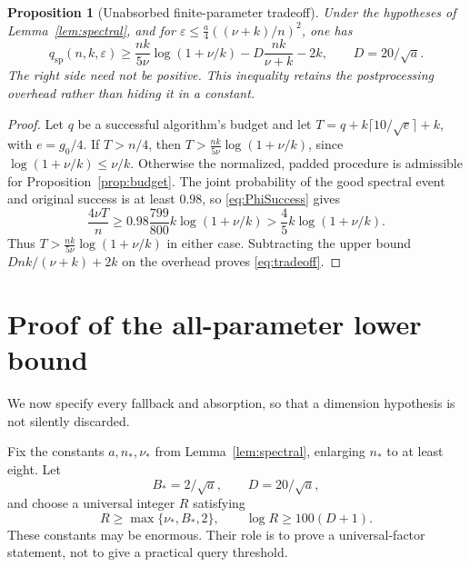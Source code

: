 \documentclass[11pt]{article}
\numberwithin{equation}{section}
\newtheorem{proposition}[theorem]{Proposition}
\theoremstyle{remark}\newtheorem{remark}[theorem]{Remark}
\newcommand{\eps}{\varepsilon}
\newcommand{\qsp}{q_{\mathrm{sp}}}
\begin{document}
\begin{proposition}[Unabsorbed finite-parameter tradeoff]\label{prop:tradeoff}
Under the hypotheses of Lemma~\ref{lem:spectral}, and for
$\eps\le \frac a4((\nu+k)/n)^2$, one has
\begin{equation}\label{eq:tradeoff}
\qsp(n,k,\eps)\ge
\frac{nk}{5\nu}\log(1+\nu/k)-D\frac{nk}{\nu+k}-2k,
\qquad D=20/\sqrt a.
\end{equation}
The right side need not be positive. This inequality retains the postprocessing overhead rather than hiding it in a constant.
\end{proposition}
\begin{proof}
Let $q$ be a successful algorithm's budget and let
$T=q+k\lceil10/\sqrt e\rceil+k$, with $e=g_0/4$.
If $T>n/4$, then $T>\frac{nk}{5\nu}\log(1+\nu/k)$, since
$\log(1+\nu/k)\le\nu/k$. Otherwise the normalized, padded procedure is admissible for Proposition~\ref{prop:budget}. The joint probability of the good spectral event and original success is at least $0.98$, so \eqref{eq:PhiSuccess} gives
\[
\frac{4\nu T}{n}\ge0.98\frac{799}{800}k\log(1+\nu/k)
>\frac45 k\log(1+\nu/k).
\]
Thus $T>\frac{nk}{5\nu}\log(1+\nu/k)$ in either case. Subtracting the upper bound $Dnk/(\nu+k)+2k$ on the overhead proves \eqref{eq:tradeoff}.
\end{proof}

\section{Proof of the all-parameter lower bound}\label{sec:globalproof}
We now specify every fallback and absorption, so that a dimension hypothesis is not silently discarded.

Fix the constants $a,n_*,\nu_*$ from Lemma~\ref{lem:spectral}, enlarging $n_*$ to at least eight. Let
\begin{equation}\label{eq:constants}
B_*=2/\sqrt a,\qquad D=20/\sqrt a,
\end{equation}
and choose a universal integer $R$ satisfying
\begin{equation}\label{eq:R}
R\ge\max\{\nu_*,B_*,2\},\qquad \log R\ge100(D+1).
\end{equation}
These constants may be enormous. Their role is to prove a universal-factor statement, not to give a practical query threshold.
\end{document}
